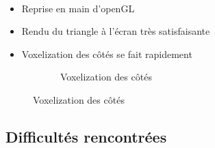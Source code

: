 \begin{frame}[fragile=singleslide]{\insertsectionhead}
  \framesubtitle{\insertsubsectionhead}
  \begin{itemize}
    \item Reprise en main d'openGL
    \vspace{.3cm}
    \item Rendu du triangle à l'écran très satisfaisante
    \vspace{.3cm}
    \item Voxelization des côtés se fait rapidement
  \end{itemize}
  \vspace{.4cm}
  \begin{figure}
        \begin{subfigure}{0.6\textwidth}
          \caption*{Voxelization des côtés}
        \end{subfigure}
      \end{figure}
\end{frame}

\subsection{Difficultés rencontrées}

